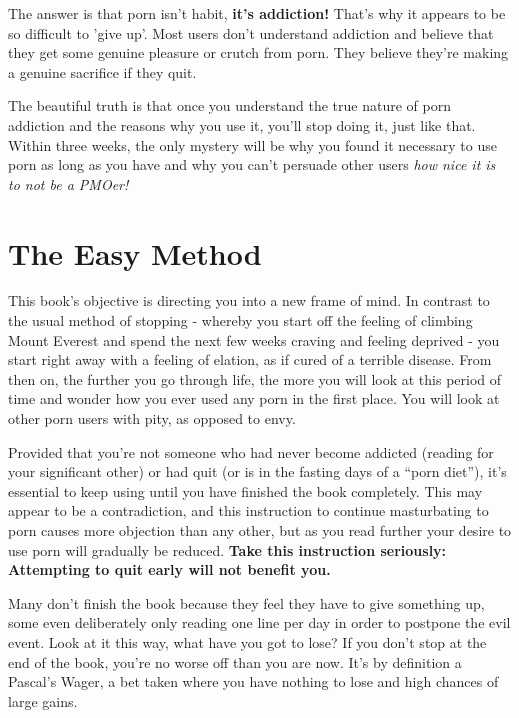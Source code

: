 \documentclass[
]{book}
\begin{document}
The answer is that porn isn't habit, \textbf{it's addiction!} That's why it appears to be so difficult to 'give up'. Most users don't understand addiction and believe that they get some genuine pleasure or crutch from porn. They believe they're making a genuine sacrifice if they quit.

The beautiful truth is that once you understand the true nature of porn addiction and the reasons why you use it, you'll stop doing it, just like that. Within three weeks, the only mystery will be why you found it necessary to use porn as long as you have and why you can't persuade other users \emph{how nice it is to not be a PMOer!}

\hypertarget{the-easy-method}{%
\chapter{The Easy Method}\label{the-easy-method}}

This book's objective is directing you into a new frame of mind. In contrast to the usual method of stopping - whereby you start off the feeling of climbing Mount Everest and spend the next few weeks craving and feeling deprived - you start right away with a feeling of elation, as if cured of a terrible disease. From then on, the further you go through life, the more you will look at this period of time and wonder how you ever used any porn in the first place. You will look at other porn users with pity, as opposed to envy.

Provided that you're not someone who had never become addicted (reading for your significant other) or had quit (or is in the fasting days of a ``porn diet''), it's essential to keep using until you have finished the book completely. This may appear to be a contradiction, and this instruction to continue masturbating to porn causes more objection than any other, but as you read further your desire to use porn will gradually be reduced. \textbf{Take this instruction seriously: Attempting to quit early will not benefit you.}

Many don't finish the book because they feel they have to give something up, some even deliberately only reading one line per day in order to postpone the evil event. Look at it this way, what have you got to lose? If you don't stop at the end of the book, you're no worse off than you are now. It's by definition a Pascal's Wager, a bet taken where you have nothing to lose and high chances of large gains.
\end{document}
